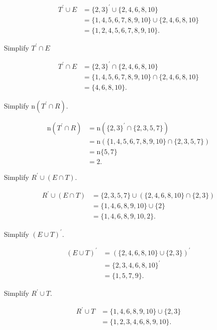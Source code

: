 \documentclass[8pt]{article}
\begin{document}
		\solution
		
		\begin{align*}
			T^{\prime} \cup E &= \{2, 3\}^{\prime} \cup \{2, 4, 6, 8, 10\}\\
			&= \{1, 4, 5, 6, 7, 8, 9, 10\} \cup \{2, 4, 6, 8, 10\}\\
			&= \{1, 2, 4, 5, 6, 7, 8, 9, 10\}.
		\end{align*}

		\prob Simplify \(T^{\prime} \cap E\)
		
		\solution
		
		\begin{align*}
			T^{\prime} \cap E &= \{2, 3\}^{\prime} \cap \{2, 4, 6, 8, 10\}\\
			&= \{1, 4, 5, 6, 7, 8, 9, 10\} \cap \{2, 4, 6, 8, 10\}\\
			&= \{4, 6, 8, 10\}.
		\end{align*}

		\prob Simplify \(\mathrm{n} \left(T^{\prime} \cap R\right)\).
		
		\solution
		
		\begin{align*}
			\mathrm{n} \left(T^{\prime} \cap R\right) &= \mathrm{n} \left(\{2, 3\}^{\prime} \cap \{2, 3, 5, 7\}\right)\\
			&= \mathrm{n} \left(\{1, 4, 5, 6, 7, 8, 9, 10\} \cap \{2, 3, 5, 7\}\right)\\
			&= \mathrm{n} \{5, 7\}\\
			&= 2.
		\end{align*}

		\prob Simplify \(R^{\prime} \cup \left(E \cap T\right)\).
		
		\solution
		
		\begin{align*}
			R^{\prime} \cup \left(E \cap T\right) &= \{2, 3, 5, 7\} \cup \left(\{2, 4, 6, 8, 10\} \cap \{2, 3\}\right)\\
			&= \{1, 4, 6, 8, 9, 10\} \cup \{2\}\\
			&= \{1, 4, 6, 8, 9, 10, 2\}.
		\end{align*}

		\prob Simplify \(\left(E \cup T\right)^{\prime}\).
		
		\solution
		
		\begin{align*}
			\left(E \cup T\right)^{\prime} &= \left(\{2, 4, 6, 8, 10\} \cup \{2, 3\}\right)^{\prime}\\
			&= \{2, 3, 4, 6, 8, 10\}^{\prime}\\
			&= \{1, 5, 7, 9\}.
		\end{align*}

		\prob Simplify \(R^{\prime} \cup T\).
		
		\solution
		
		\begin{align*}
			R^{\prime} \cup T &= \{1, 4, 6, 8, 9, 10\} \cup \{2, 3\}\\
			&= \{1, 2, 3, 4, 6, 8, 9, 10\}.
		\end{align*}
\end{document}
